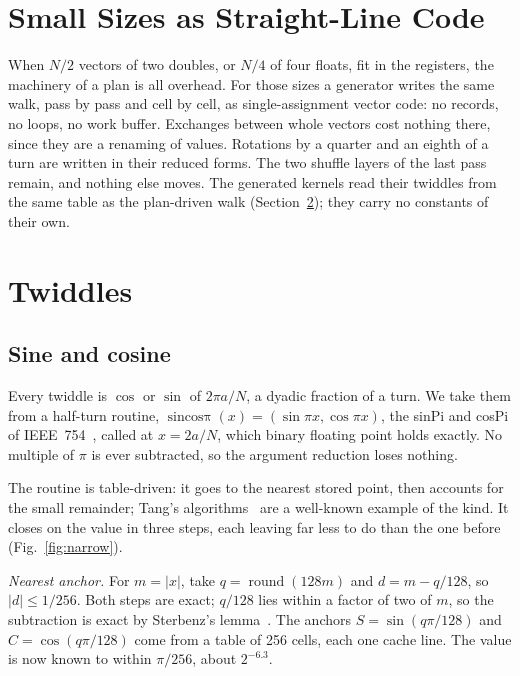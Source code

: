 \documentclass[conference]{IEEEtran}
\begin{document}
\section{Small Sizes as Straight-Line Code}\label{sec:small}

When $N/2$ vectors of two doubles, or $N/4$ of four floats, fit in the registers, the machinery of a plan is all overhead.
For those sizes a generator writes the same walk, pass by pass and cell by cell, as single-assignment vector code: no records, no loops, no work buffer.
Exchanges between whole vectors cost nothing there, since they are a renaming of values.
Rotations by a quarter and an eighth of a turn are written in their reduced forms.
The two shuffle layers of the last pass remain, and nothing else moves.
The generated kernels read their twiddles from the same table as the plan-driven walk (Section~\ref{sec:twiddles}); they carry no constants of their own.

\section{Twiddles}\label{sec:twiddles}

\subsection{Sine and cosine}\label{sec:sincos}

Every twiddle is $\cos$ or $\sin$ of $2\pi a/N$, a dyadic fraction of a turn.
We take them from a half-turn routine, $\operatorname{sincos\pi}(x)=(\sin\pi x,\cos\pi x)$, the sinPi and cosPi of IEEE~754~\cite{ieee754}, called at $x=2a/N$, which binary floating point holds exactly.
No multiple of $\pi$ is ever subtracted, so the argument reduction loses nothing.

The routine is table-driven: it goes to the nearest stored point, then accounts for the small remainder; Tang's algorithms~\cite{tang} are a well-known example of the kind.
It closes on the value in three steps, each leaving far less to do than the one before (Fig.~\ref{fig:narrow}).

\emph{Nearest anchor.}
For $m=|x|$, take $q=\operatorname{round}(128m)$ and $d=m-q/128$, so $|d|\le1/256$.
Both steps are exact; $q/128$ lies within a factor of two of $m$, so the subtraction is exact by Sterbenz's lemma~\cite{sterbenz}.
The anchors $S=\sin(q\pi/128)$ and $C=\cos(q\pi/128)$ come from a table of 256 cells, each one cache line.
The value is now known to within $\pi/256$, about $2^{-6.3}$.
\end{document}
